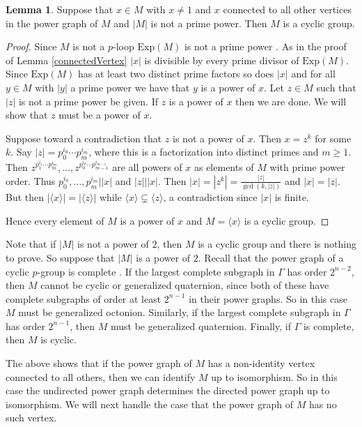 \documentclass[12pt, twoside, openright]{report}
\theoremstyle{definition}
\newtheorem{lem}[thm]{Lemma}
\newcommand{\Exp}{\text{Exp}}       %
\begin{document}
\begin{lem}
  Suppose that $x\in M$ with $x\neq 1$ and $x$ connected to all other vertices in the power
    graph of $M$ and $|M|$ is not a prime power. Then $M$ is a cyclic group.
\end{lem}

\begin{proof}
  Since $M$ is not a $p$-loop $\Exp(M)$ is not a prime power \cite{64and81}. As in the proof of
    Lemma \ref{connectedVertex} $|x|$ is divisible by every prime divisor of $\Exp(M)$. Since
    $\Exp(M)$ has at least two distinct prime factors so does $|x|$ and for all $y\in M$ with
    $|y|$ a prime power we have that $y$ is a power of $x$. Let $z\in M$ such that $|z|$ is not
    a prime power be given. If $z$ is a power of $x$ then we are done. We will show that $z$
    must be a power of $x$.

  Suppose toward a contradiction that $z$ is not a power of $x$. Then $x = z^k$ for some $k$.
    Say $|z| = p_0^{i_0}\cdots p_m^{i_m}$, where this is a factorization into distinct primes
    and $m\geq 1$. Then $z^{p_1^{i_1}\cdots p_m^{i_m}}, \ldots, z^{p_0^{i_0}\cdots p_{m - 1}^{i_{m - 1}}}$
    are all powers of $x$ as elements of $M$ with prime power order.
    Thus $p_0^{i_0}, \ldots, p_m^{i_m} | |x|$ and $|z| | |x|$. 
    Then $|x| = |z^k| = \frac{|z|}{\gcd(k, |z|)}$ and $|x| = |z|$. But then
    $|\langle x\rangle| = |\langle z\rangle|$ while $\langle x\rangle \subsetneq \langle z\rangle$,
    a contradiction since $|x|$ is finite.

  Hence every element of $M$ is a power of $x$ and $M = \langle x\rangle$ is a cyclic group.
\end{proof}

  Note that if $|M|$ is not a power of $2$, then $M$ is a cyclic group and there is nothing to prove.
    So suppose that $|M|$ is a power of $2$. Recall that the power graph of a cyclic $p$-group is
    complete \cite{Ivy}. If the largest complete subgraph in $\Gamma$ has order $2^{n - 2}$, then $M$
    cannot be cyclic or generalized quaternion, since both of these have complete subgraphs of order
    at least $2^{n - 1}$ in their power graphs. So in this case $M$ must be generalized octonion.
    Similarly, if the largest complete subgraph in $\Gamma$ has order $2^{n - 1}$, then $M$ must be
    generalized quaternion. Finally, if $\Gamma$ is complete, then $M$ is cyclic.

  The above shows that if the power graph of $M$ has a non-identity vertex connected to all others,
    then we can identify $M$ up to isomorphism. So in this case the undirected power graph determines
    the directed power graph up to isomorphism. We will next handle the case that the power graph of
    $M$ has no such vertex.
\end{document}
